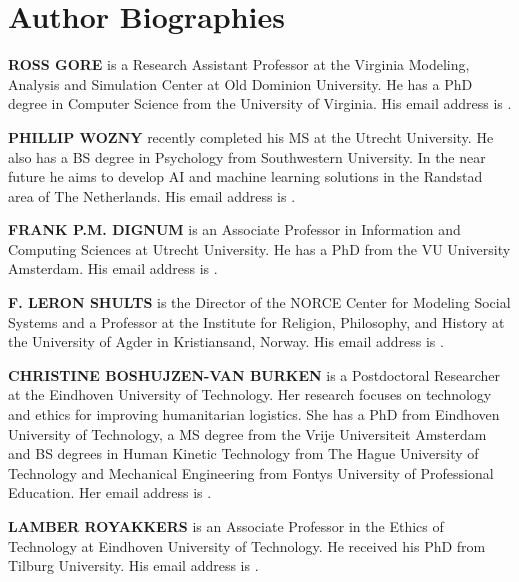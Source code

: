 \documentclass{scspaperproc}
\theoremstyle{scsthe}
\begin{document}
\section*{Author Biographies}

\textbf{\uppercase{ROSS GORE}} is a Research Assistant Professor at the Virginia Modeling, Analysis and Simulation Center at Old Dominion University. He has a PhD degree in Computer Science from the University of Virginia. His email address is .

\textbf{\uppercase{PHILLIP WOZNY}} recently completed his MS at the Utrecht University. He also has a BS degree in Psychology from Southwestern University. In the near future he aims to develop AI and machine learning solutions in the Randstad area of The Netherlands. His email address is .

\textbf{\uppercase{FRANK P.M. DIGNUM}} is an Associate Professor in Information and Computing Sciences at Utrecht University. He has a PhD from the VU University Amsterdam. His email address is .

\textbf{\uppercase{F. LERON SHULTS}} is the Director of the NORCE Center for Modeling Social Systems and a Professor at the Institute for Religion, Philosophy, and History at the University of Agder in Kristiansand, Norway. His email address is .

\textbf{\uppercase{CHRISTINE BOSHUJZEN-VAN BURKEN}} is a Postdoctoral Researcher at the Eindhoven University of Technology. Her research focuses on technology and ethics for improving humanitarian logistics. She has a PhD from Eindhoven University of Technology, a MS degree from the Vrije Universiteit Amsterdam and BS degrees in Human Kinetic Technology from The Hague University of Technology and Mechanical Engineering from Fontys University of Professional Education. Her email address is .

\textbf{\uppercase{LAMBER ROYAKKERS}} is an Associate Professor in the Ethics of Technology at Eindhoven University of Technology. He received his PhD from Tilburg University. His email address is .
\end{document}
